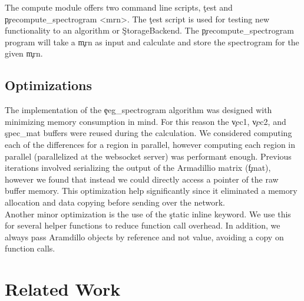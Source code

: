 The compute module offers two command line scripts, \c{test} and
\c{precompute\_spectrogram <mrn>}. The \c{test} script is used for testing new
functionality to an algorithm or \c{StorageBackend}. The
\c{precompute\_spectrogram} program will take a \c{mrn} as input and calculate
and store the spectrogram for the given \c{mrn}.

\subsection{Optimizations}

The implementation of the \c{eeg\_spectrogram} algorithm was designed with
minimizing memory consumption in mind. For this reason the \c{vec1}, \c{vec2},
and \c{spec\_mat} buffers were reused during the calculation. We considered
computing each of the differences for a region in parallel, however computing
each region in parallel (parallelized at the websocket server) was performant
enough. Previous iterations involved serializing the output of the Armadillio
matrix (\c{fmat}), however we found that instead we could directly access a
pointer of the raw buffer memory. This optimization help significantly since it
eliminated a memory allocation and data copying before sending over the
network. \\

Another minor optimization is the use of the \c{static inline} keyword. We use
this for several helper functions to reduce function call overhead. In
addition, we always pass Aramdillo objects by reference and not value, avoiding
a copy on function calls.

\section{Related Work}

